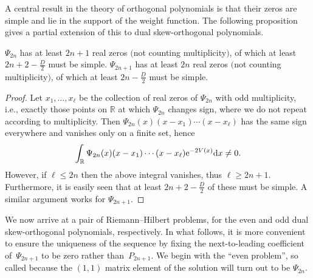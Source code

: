 A central result in the theory of orthogonal polynomials is that their zeros are simple and lie in the support of the weight function. The following proposition gives a partial extension of this to dual skew-orthogonal polynomials.
\begin{Proposition}
$\Psi_{2n}$ has at least $2n+1$ real zeros $($not counting multiplicity$)$, of which at least $2n+2-\frac{D}{2}$ must be simple. $\Psi_{2n+1}$ has at least $2n$ real zeros $($not counting multiplicity$)$, of which at least $2n - \frac{D}{2}$ must be simple.
\end{Proposition}
\begin{proof}
Let $ x_1, \dots, x_\ell$ be the collection of real zeros of $\Psi_{2n}$ with odd multiplicity, i.e., exactly those points on $\mathbb{R}$ at which $\Psi_{2n}$ changes sign, where we do not repeat according to multiplicity. Then $\Psi_{2n}(x)(x-x_1)\cdots (x-x_\ell)$ has the same sign everywhere and vanishes only on a finite set, hence
\begin{equation*}
\int_\mathbb{R} \Psi_{2n}(x)(x-x_1)\cdots (x-x_\ell) {\rm e}^{-2V(x)} {\rm d}x \neq 0 .
\end{equation*}
However, if $\ell \leq 2n$ then the above integral vanishes, thus $\ell \geq 2n+1$. Furthermore, it is easily seen that at least $2n+2-\frac{D}{2}$ of these must be simple. A similar argument works for $\Psi_{2n+1}$.
\end{proof}

We now arrive at a pair of Riemann--Hilbert problems, for the even and odd dual skew-orthogonal polynomials, respectively. In what follows, it is more convenient to ensure the uniqueness of the sequence by fixing the next-to-leading coefficient of~$\Psi_{2n+1}$ to be zero rather than~$P_{2n+1}$. We begin with the \enquote{even problem}, so called because the $(1,1)$ matrix element of the solution will turn out to be $\Psi_{2n}$.

